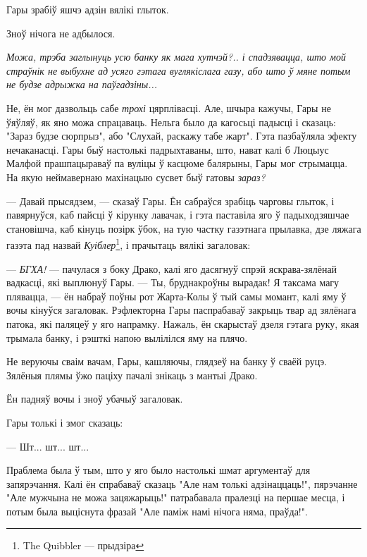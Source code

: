 Гары зрабіў яшчэ адзін вялікі глыток.

Зноў нічога не адбылося.

\emph{Можа, трэба заглынуць усю банку як мага хутчэй?.. і спадзявацца, што мой
страўнік не выбухне ад усяго гэтага вуглякіслага газу, або што ў мяне потым не 
будзе адрыжка на паўгадзіны...}

Не, ён мог дазвольць сабе \emph{трохі} цярплівасці. Але, шчыра кажучы, Гары
не ўяўляў, як яно можа спрацаваць. Нельга было да кагосьці падысці і сказаць:
"Зараз будзе сюрпрыз", або "Слухай, раскажу табе жарт". Гэта пазбаўляла эфекту 
нечаканасці. Гары быў настолькі падрыхтаваны, што, нават калі б Люцыус Малфой
прашпацыраваў па вуліцы ў касцюме балярыны, Гары  мог стрымацца.
На якую неймавернаю махінацыю сусвет быў гатовы \emph{зараз?}
 
--- Давай прысядзем, --- сказаў Гары. Ён сабраўся зрабіць чарговы глыток, і павярнуўся,
каб пайсці ў кірунку лавачак, і гэта паставіла яго ў падыходзяшчае становішча, 
каб кінуць позірк ўбок, на тую частку газэтнага прылавка, дзе ляжага газэта 
пад назвай \emph{Куіблер}\footnote{The Quibbler --- прыдзіра}, і прачытаць
вялікі загаловак:


--- \emph{БГХА!} --- пачулася з боку Драко, калі яго дасягнуў спрэй яскрава-зялёнай
вадкасці, які выплюнуў Гары. --- Ты, бруднакроўны вырадак! Я таксама магу плявацца, ---
ён набраў поўны рот Жарта-Колы ў тый самы момант, калі яму ў вочы кінуўся загаловак.
Рэфлекторна Гары паспрабаваў закрыць твар ад зялёнага патока, які паляцеў у яго напрамку.
Нажаль, ён скарыстаў дзеля гэтага руку, якая трымала банку, і рэшткі напою 
вылілілся яму на плячо.

Не веруючы сваім вачам, Гары, кашляючы, глядзеў на банку ў сваёй руцэ.
Зялёныя плямы ўжо паціху пачалі знікаць з мантыі Драко.

Ён падняў вочы і зноў убачыў загаловак.



Гары толькі і змог сказаць:

--- Шт... шт... шт...

Праблема была ў тым, што у яго было настолькі шмат аргументаў для запярэчання. Калі ён спрабаваў
сказаць "Але нам толькі адзінаццаць!", пярэчанне "Але мужчына не можа зацяжарыць!" 
патрабавала пралезці на першае месца, і потым была выціснута фразай 
"Але паміж намі нічога няма, праўда!".

